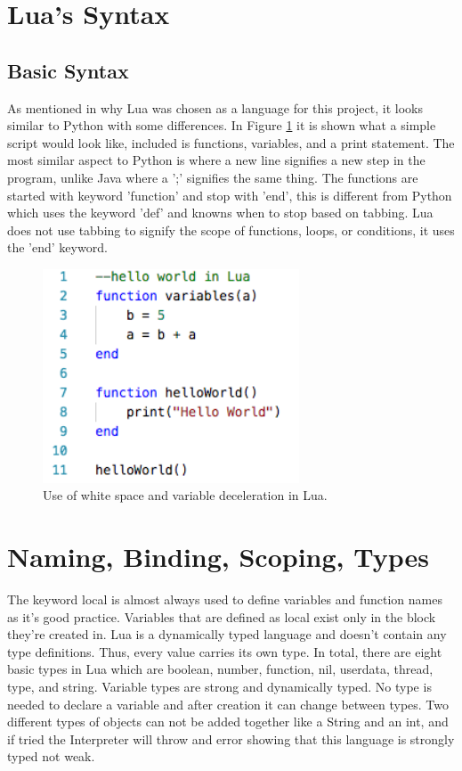 \documentclass[12pt]{article}
\begin{document}
\section{Lua's Syntax}
\subsection{Basic Syntax}
As mentioned in why Lua was chosen as a language for this project, it looks similar to Python with some differences.  In  Figure \ref{fig:LuaSample} it is shown what a simple script would look like, included is functions, variables, and a print statement.  The most similar aspect to Python is where a new line signifies a new step in the program, unlike Java where a ';' signifies the same thing.  The functions are started with keyword 'function' and stop with 'end', this is different from Python which uses the keyword 'def' and knowns when to stop based on tabbing.  Lua does not use tabbing to signify the scope of functions, loops, or conditions, it uses the 'end' keyword.

\begin{figure}
\begin{center}
\includegraphics[width=3in]{LuaSample.png}
\end{center}
\caption{\label{fig:LuaSample} Use of white space and variable deceleration in Lua.}
\end{figure}

\section{Naming, Binding, Scoping, Types}
The keyword local is almost always used to define variables and function names as it's good practice.  Variables that are defined as local exist only in the block they're created in.  Lua is a dynamically typed language and doesn't contain any type definitions. Thus, every value carries its own type.  In total, there are eight basic types in Lua which are boolean, number, function, nil, userdata, thread, type, and string.  Variable types are strong and dynamically typed.  No type is needed to declare a variable and after creation it can change between types.  Two different types of objects can not be added together like a String and an int, and if tried the Interpreter will throw and error showing that this language is strongly typed not weak.
\end{document}
